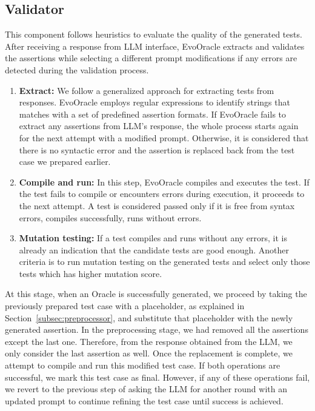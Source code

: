\vspace{0.1 cm}
\subsection{Validator}
\label{subsec:validator}
\vspace{0.1 cm}

    This component follows heuristics to evaluate the quality of the generated tests. After receiving a response from LLM interface, EvoOracle extracts and validates the assertions while selecting a different prompt modifications if any errors are detected during the validation process. 
    \begin{enumerate}
        \item \textbf{Extract:} We follow a generalized approach for extracting tests from responses. EvoOracle employs regular expressions to identify strings that matches with a set of predefined assertion formats. If EvoOracle fails to extract any assertions from LLM’s response, the whole process starts again for the next attempt with a modified prompt. Otherwise, it is considered that there is no syntactic error and the assertion is replaced back from the test case we prepared earlier.
        \item \textbf{Compile and run:} In this step, EvoOracle compiles and executes the test. If the test fails to compile or encounters errors during execution, it proceeds to the next attempt. A test is considered passed only if it is free from syntax errors, compiles successfully, runs without errors.
        \item \textbf{Mutation testing:} If a test compiles and runs without any errors, it is already an indication that the candidate tests are good enough. Another criteria is to run mutation testing on the generated tests and select only those tests which has higher mutation score.
    \end{enumerate}

At this stage, when an Oracle is successfully generated, we proceed by taking the previously prepared test case with a placeholder, as explained in Section~\ref{subsec:preprocessor}, and substitute that placeholder with the newly generated assertion. In the preprocessing stage, we had removed all the assertions except the last one. Therefore, from the response obtained from the LLM, we only consider the last assertion as well. Once the replacement is complete, we attempt to compile and run this modified test case. If
both operations are successful, we mark this test case as final. However, if any of these operations fail, we revert to the previous step of asking the LLM for another round with an updated prompt to continue refining the test case until success is achieved.

